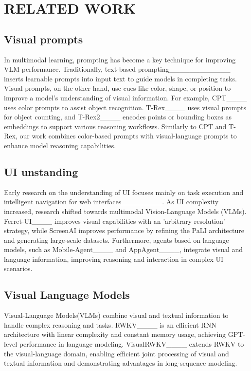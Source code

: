 \section{RELATED WORK}
\subsection{Visual prompts}
In multimodal learning, prompting has become a key technique for improving VLM performance. Traditionally, text-based prompting____________ inserts learnable prompts into input text to guide models in completing tasks. Visual prompts, on the other hand, use cues like color, shape, or position to improve a model's understanding of visual information. For example, CPT____  uses color prompts to assist object recognition. T-Rex____ uses visual prompts for object counting, and T-Rex2____ encodes points or bounding boxes as embeddings to support various reasoning workflows. Similarly to CPT and T-Rex,  our work combines color-based prompts with visual-language prompts to enhance model reasoning capabilities.
\subsection{UI unstanding}
Early research on the understanding of UI focuses mainly on task execution and intelligent navigation for web interfaces________. As UI complexity increased, research shifted towards multimodal Vision-Language Models (VLMs). Ferret-UI____ improves visual capabilities with an 'arbitrary resolution' strategy, while ScreenAI improves performance by refining the PaLI architecture and generating large-scale datasets. Furthermore, agents based on language models, such as Mobile-Agent____ and AppAgent____, integrate visual and language information, improving reasoning and interaction in complex UI scenarios.
\subsection{Visual Language Models} 
Visual-Language Models(VLMs) combine visual and textual information to handle complex reasoning and tasks. RWKV____ is an efficient RNN architecture with linear complexity and constant memory usage, achieving GPT-level performance in language modeling. VisualRWKV____ extends RWKV to the visual-language domain, enabling efficient joint processing of visual and textual information and demonstrating advantages in long-sequence modeling.